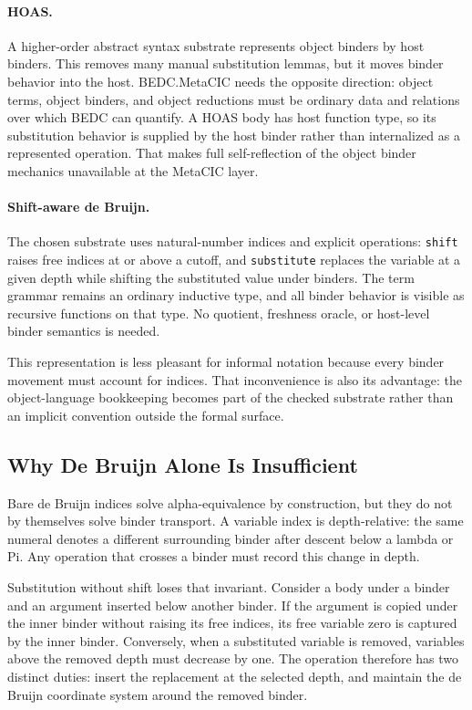 \paragraph{HOAS.}
A higher-order abstract syntax substrate represents object binders by host
binders. This removes many manual substitution lemmas, but it moves binder
behavior into the host. BEDC.MetaCIC needs the opposite direction: object
terms, object binders, and object reductions must be ordinary data and
relations over which BEDC can quantify. A HOAS body has host function type, so
its substitution behavior is supplied by the host binder rather than
internalized as a represented operation. That makes full self-reflection of the
object binder mechanics unavailable at the MetaCIC layer.

\paragraph{Shift-aware de Bruijn.}
The chosen substrate uses natural-number indices and explicit operations:
\texttt{shift} raises free indices at or above a cutoff, and
\texttt{substitute} replaces the variable at a given depth while shifting the
substituted value under binders.
The term grammar remains an ordinary inductive type, and all binder behavior is
visible as recursive functions on that type. No quotient, freshness oracle, or
host-level binder semantics is needed.

This representation is less pleasant for informal notation because every binder
movement must account for indices. That inconvenience is also its advantage:
the object-language bookkeeping becomes part of the checked substrate rather
than an implicit convention outside the formal surface.

\subsection{Why De Bruijn Alone Is Insufficient}
\label{subsec:why-de-bruijn-alone-insufficient}

Bare de Bruijn indices solve alpha-equivalence by construction, but they do not
by themselves solve binder transport. A variable index is depth-relative: the
same numeral denotes a different surrounding binder after descent below a
lambda or Pi. Any operation that crosses a binder must record this change in
depth.

Substitution without shift loses that invariant. Consider a body under a binder
and an argument inserted below another binder. If the argument is copied under
the inner binder without raising its free indices, its free variable zero is
captured by the inner binder. Conversely, when a substituted variable is
removed, variables above the removed depth must decrease by one. The operation
therefore has two distinct duties: insert the replacement at the selected
depth, and maintain the de Bruijn coordinate system around the removed binder.

